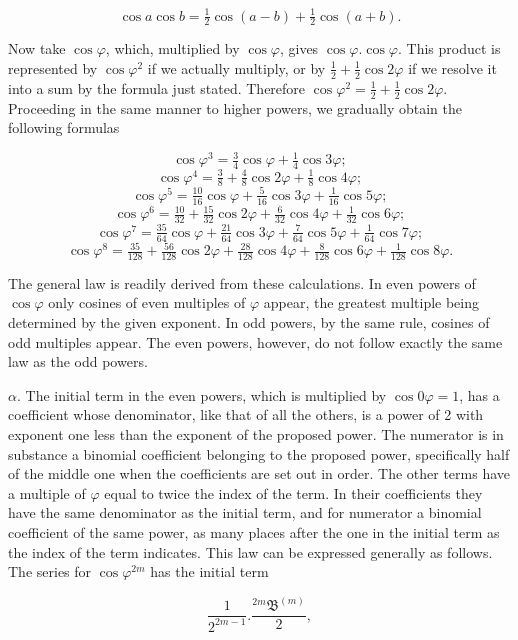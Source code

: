 \[ \cos a \cos b = \tfrac12\cos(a-b)+\tfrac12\cos(a+b). \]

\par\noindent\hspace*{\parindent}Now take $\cos\varphi$, which, multiplied by $\cos\varphi$, gives $\cos\varphi . \cos\varphi$. This product is represented by $\cos\varphi^2$ if we actually multiply, or by $\tfrac12+\tfrac12\cos 2\varphi$ if we resolve it into a sum by the formula just stated. Therefore $\cos\varphi^2 = \tfrac12+\tfrac12\cos 2\varphi$. Proceeding in the same manner to higher powers, we gradually obtain the following formulas

\[ \cos\varphi^3 = \tfrac34\cos\varphi + \tfrac14\cos 3\varphi ; \]
\[ \cos\varphi^4 = \tfrac38 + \tfrac48\cos 2\varphi + \tfrac18\cos 4\varphi ; \]
\[ \cos\varphi^5 = \tfrac{10}{16}\cos\varphi + \tfrac{5}{16}\cos 3\varphi + \tfrac{1}{16}\cos 5\varphi ; \]
\[ \cos\varphi^6 = \tfrac{10}{32} + \tfrac{15}{32}\cos 2\varphi + \tfrac{6}{32}\cos 4\varphi + \tfrac{1}{32}\cos 6\varphi ; \]
\[ \cos\varphi^7 = \tfrac{35}{64}\cos\varphi + \tfrac{21}{64}\cos 3\varphi + \tfrac{7}{64}\cos 5\varphi + \tfrac{1}{64}\cos 7\varphi ; \]
\[ \cos\varphi^8 = \tfrac{35}{128} + \tfrac{56}{128}\cos 2\varphi + \tfrac{28}{128}\cos 4\varphi + \tfrac{8}{128}\cos 6\varphi + \tfrac{1}{128}\cos 8\varphi . \]

\par\noindent The general law is readily derived from these calculations. In even powers of $\cos\varphi$ only cosines of even multiples of $\varphi$ appear, the greatest multiple being determined by the given exponent. In odd powers, by the same rule, cosines of odd multiples appear. The even powers, however, do not follow exactly the same law as the odd powers.

$\alpha$. The initial term in the even powers, which is multiplied by $\cos 0\varphi = 1$, has a coefficient whose denominator, like that of all the others, is a power of 2 with exponent one less than the exponent of the proposed power. The numerator is in substance a binomial coefficient belonging to the proposed power, specifically half of the middle one when the coefficients are set out in order. The other terms have a multiple of $\varphi$ equal to twice the index of the term. In their coefficients they have the same denominator as the initial term, and for numerator a binomial coefficient of the same power, as many places after the one in the initial term as the index of the term indicates. This law can be expressed generally as follows. The series for $\cos\varphi^{2m}$ has the initial term

\[ \frac{1}{2^{2m-1}} . \frac{{}^{2m}\mathfrak{B}^{(m)}}{2}, \]
